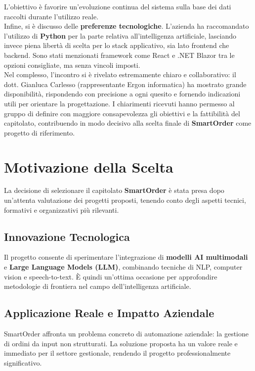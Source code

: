 \documentclass[a4paper, 11pt, oneside]{scrartcl} %
\begin{document}
L’obiettivo è favorire un’evoluzione continua del sistema sulla base dei dati raccolti durante l’utilizzo reale.
\noindent \\
Infine, si è discusso delle \textbf{preferenze tecnologiche}.  
L’azienda ha raccomandato l’utilizzo di \textbf{Python} per la parte relativa all’intelligenza artificiale, lasciando invece piena libertà di scelta per lo stack applicativo, sia lato frontend che backend.  
Sono stati menzionati framework come React e .NET Blazor tra le opzioni consigliate, ma senza vincoli imposti.
\noindent \\
Nel complesso, l’incontro si è rivelato estremamente chiaro e collaborativo: il dott. Gianluca Carlesso (rappresentante Ergon informatica) ha mostrato grande disponibilità, rispondendo con precisione a ogni quesito e fornendo indicazioni utili per orientare la progettazione.  
I chiarimenti ricevuti hanno permesso al gruppo di definire con maggiore consapevolezza gli obiettivi e la fattibilità del capitolato, contribuendo in modo decisivo alla scelta finale di \textbf{SmartOrder} come progetto di riferimento.
\newpage
\section{Motivazione della Scelta}

La decisione di selezionare il capitolato \textbf{SmartOrder} è stata presa dopo un’attenta valutazione dei progetti proposti, tenendo conto degli aspetti tecnici, formativi e organizzativi più rilevanti.

\subsection*{Innovazione Tecnologica}
Il progetto consente di sperimentare l’integrazione di \textbf{modelli AI multimodali} e \textbf{Large Language Models (LLM)}, combinando tecniche di NLP, computer vision e speech-to-text. È quindi un’ottima occasione per approfondire metodologie di frontiera nel campo dell’intelligenza artificiale.

\subsection*{Applicazione Reale e Impatto Aziendale}
SmartOrder affronta un problema concreto di automazione aziendale: la gestione di ordini da input non strutturati. La soluzione proposta ha un valore reale e immediato per il settore gestionale, rendendo il progetto professionalmente significativo.
\end{document}

